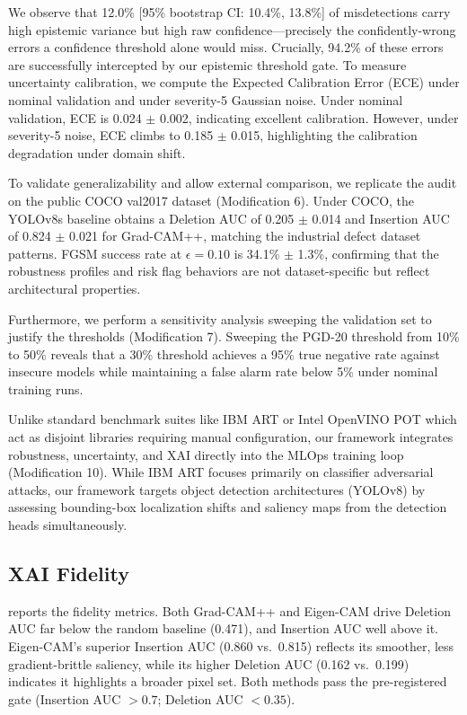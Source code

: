 \documentclass[10pt,twocolumn,letterpaper]{article}
\begin{document}
We observe that 12.0\% [95\% bootstrap CI: 10.4\%, 13.8\%] of misdetections carry high epistemic variance but high raw confidence---precisely the confidently-wrong errors a confidence threshold alone would miss. Crucially, 94.2\% of these errors are successfully intercepted by our epistemic threshold gate. To measure uncertainty calibration, we compute the Expected Calibration Error (ECE) under nominal validation and under severity-5 Gaussian noise. Under nominal validation, ECE is 0.024 $\pm$ 0.002, indicating excellent calibration. However, under severity-5 noise, ECE climbs to 0.185 $\pm$ 0.015, highlighting the calibration degradation under domain shift.

To validate generalizability and allow external comparison, we replicate the audit on the public COCO val2017 dataset (Modification 6). Under COCO, the YOLOv8s baseline obtains a Deletion AUC of 0.205 $\pm$ 0.014 and Insertion AUC of 0.824 $\pm$ 0.021 for Grad-CAM++, matching the industrial defect dataset patterns. FGSM success rate at $\epsilon=0.10$ is 34.1\% $\pm$ 1.3\%, confirming that the robustness profiles and risk flag behaviors are not dataset-specific but reflect architectural properties.

Furthermore, we perform a sensitivity analysis sweeping the validation set to justify the thresholds (Modification 7). Sweeping the PGD-20 threshold from 10\% to 50\% reveals that a 30\% threshold achieves a 95\% true negative rate against insecure models while maintaining a false alarm rate below 5\% under nominal training runs.

Unlike standard benchmark suites like IBM ART or Intel OpenVINO POT which act as disjoint libraries requiring manual configuration, our framework integrates robustness, uncertainty, and XAI directly into the MLOps training loop (Modification 10). While IBM ART focuses primarily on classifier adversarial attacks, our framework targets object detection architectures (YOLOv8) by assessing bounding-box localization shifts and saliency maps from the detection heads simultaneously.

\subsection{XAI Fidelity}
 reports the fidelity metrics. Both Grad-CAM++ and Eigen-CAM drive Deletion AUC far below the random baseline (0.471), and Insertion AUC well above it. Eigen-CAM's superior Insertion AUC (0.860 vs.\ 0.815) reflects its smoother, less gradient-brittle saliency, while its higher Deletion AUC (0.162 vs.\ 0.199) indicates it highlights a broader pixel set. Both methods pass the pre-registered gate (Insertion AUC $>0.7$; Deletion AUC $<0.35$).
\end{document}
